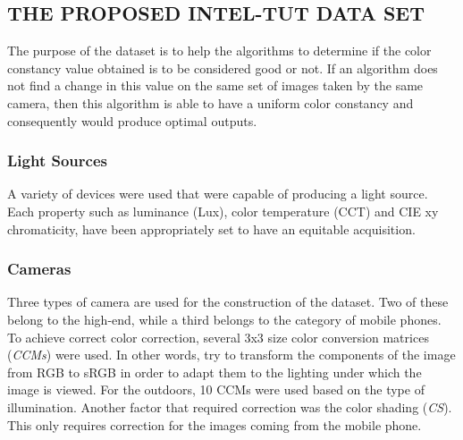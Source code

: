 \subsection{THE PROPOSED INTEL-TUT DATA SET}
The purpose of the dataset is to help the algorithms to determine if the color 
constancy value obtained is to be considered good or not. If an algorithm 
does not find a change in this value on the same set of images taken by the 
same camera, then this algorithm is able to have a uniform color constancy 
and consequently would produce optimal outputs.

\subsubsection{Light Sources}
A variety of devices were used that were capable of producing a light source. 
Each property such as luminance (Lux), color temperature (CCT) and CIE 
xy chromaticity, have been appropriately set to have an equitable acquisition.

\subsubsection{Cameras}
Three types of camera are used for the construction of the dataset. Two 
of these belong to the high-end, while a third belongs to the category of 
mobile phones. To achieve correct color correction, several 3x3 size color 
conversion matrices (\emph{CCMs}) were used. In other words, try to transform 
the components of the image from RGB to sRGB in order to adapt them to 
the lighting under which the image is viewed. For the outdoors, 10 CCMs 
were used based on the type of illumination. Another factor that required 
correction was the color shading (\emph{CS}). This only requires correction for the 
images coming from the mobile phone.
